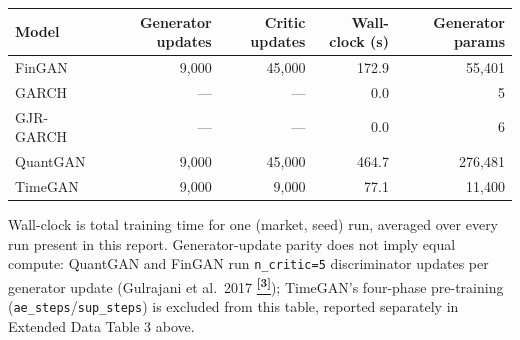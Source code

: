 \documentclass[10pt]{article}
\newcommand{\tcite}[1]{%
  \hyperlink{R:#1}{\textsuperscript{\scriptsize\textbf{[#1]}}}}
\begin{document}
\vspace{4pt}
{\small
\begin{tabular}{@{}lrrrr@{}}
\toprule
Model & Generator updates & Critic updates & Wall-clock (s) & Generator params \\
\midrule
FinGAN & 9,000 & 45,000 & 172.9 & 55,401 \\
GARCH & --- & --- & 0.0 & 5 \\
GJR-GARCH & --- & --- & 0.0 & 6 \\
QuantGAN & 9,000 & 45,000 & 464.7 & 276,481 \\
TimeGAN & 9,000 & 9,000 & 77.1 & 11,400 \\
\bottomrule
\end{tabular}}

\smallskip
{\small Wall-clock is total training time for one (market, seed) run, averaged over every run present in this report. Generator-update parity does not imply equal compute: QuantGAN and FinGAN run \texttt{n\_critic=5} discriminator updates per generator update (Gulrajani et al.\ 2017\tcite{3}); TimeGAN's four-phase pre-training (\texttt{ae\_steps}/\texttt{sup\_steps}) is excluded from this table, reported separately in Extended Data Table 3 above.}
\end{document}
